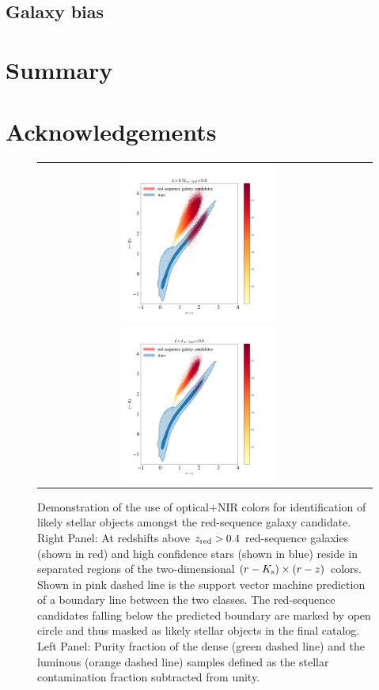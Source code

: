 \documentclass[fleqn,usenatbib,useAMS]{mnras}
\begin{document}
\subsection{Galaxy bias}
\section{Summary}\label{sec:summary} 





\section*{Acknowledgements}


\begin{figure}
\begin{tabular}{cc}
\includegraphics[width=0.5\textwidth]{figures_tmp/red_vs_star_dense.png}
\includegraphics[width=0.5\textwidth]{figures_tmp/red_vs_star_lum.png}
\end{tabular}
\caption{\label{fig:star_galaxy_I} Demonstration of the use of optical+NIR colors for identification of likely stellar objects amongst the red-sequence galaxy candidate. Right Panel: At redshifts above $z_{\rm red}>0.4$ red-sequence galaxies (shown in red) and high confidence stars (shown in blue) reside in separated regions of the two-dimensional $(r-K_{\rm s}) \times (r-z)$ colors. Shown in pink dashed line is the support vector machine prediction of a boundary line between the two classes. The red-sequence candidates falling below the predicted boundary are marked by open circle and thus masked as likely stellar objects in the final catalog. Left Panel: Purity fraction of the dense  (green dashed line) and the luminous (orange dashed line) samples defined as the stellar contamination fraction subtracted from unity.} 
\end{figure}
\end{document}
